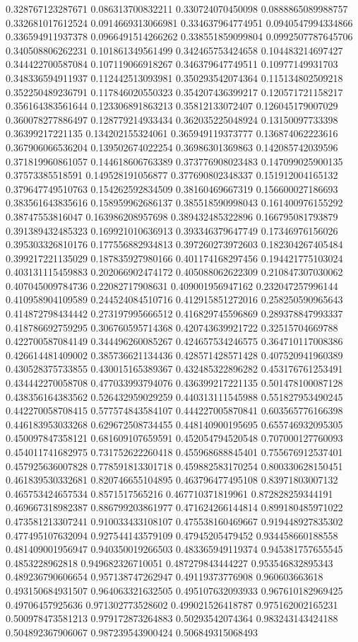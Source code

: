 \begin{table}
\begin{tabu}
\begin{sparkline}{10}
0.328767123287671 0.086313700832211 0.330724070450098 0.0888865089988757 0.332681017612524 0.0914669313066981 0.334637964774951 0.0940547994334866 0.336594911937378 0.0966491514266262 0.338551859099804 0.0992507787645706 0.340508806262231 0.101861349561499 0.342465753424658 0.104483214697427 0.344422700587084 0.107119066918267 0.346379647749511 0.10977149931703 0.348336594911937 0.112442513093981 0.350293542074364 0.115134802509218 0.352250489236791 0.117846020550323 0.354207436399217 0.120571721158217 0.356164383561644 0.123306891863213 0.35812133072407 0.126045179007029 0.360078277886497 0.128779214933434 0.362035225048924 0.13150097733398 0.36399217221135 0.134202155324061 0.365949119373777 0.136874062223616 0.367906066536204 0.139502674022254 0.36986301369863 0.142085742039596 0.371819960861057 0.144618606763389 0.373776908023483 0.147099025900135 0.37573385518591 0.149528191056877 0.377690802348337 0.151912004165132 0.379647749510763 0.154262592834509 0.38160469667319 0.156600027186693 0.383561643835616 0.158959962686137 0.385518590998043 0.161400976155292 0.38747553816047 0.163986208957698 0.389432485322896 0.166795081793879 0.391389432485323 0.169921010636913 0.393346379647749 0.17346976156026 0.395303326810176 0.177556882934813 0.397260273972603 0.182304267405484 0.399217221135029 0.187835927980166 0.401174168297456 0.194421775103024 0.403131115459883 0.202066902474172 0.405088062622309 0.210847307030062 0.407045009784736 0.22082717908631 0.409001956947162 0.232047257996144 0.410958904109589 0.244524084510716 0.412915851272016 0.258250590965643 0.414872798434442 0.273197995666512 0.416829745596869 0.289378847993337 0.418786692759295 0.306760595714368 0.420743639921722 0.32515704669788 0.422700587084149 0.344496260085267 0.424657534246575 0.364710117008386 0.426614481409002 0.385736621134436 0.428571428571428 0.407520941960389 0.430528375733855 0.430015165389367 0.432485322896282 0.453176761253491 0.434442270058708 0.477033993794076 0.436399217221135 0.501478100087128 0.438356164383562 0.526432959029259 0.440313111545988 0.551827953490245 0.442270058708415 0.577574843584107 0.444227005870841 0.603565776166398 0.446183953033268 0.629672508734455 0.448140900195695 0.655746932095305 0.450097847358121 0.681609107659591 0.452054794520548 0.707000127760093 0.454011741682975 0.731752622260418 0.455968688845401 0.755676912537401 0.457925636007828 0.778591813301718 0.459882583170254 0.800330628150451 0.461839530332681 0.820746655104895 0.463796477495108 0.83971803007132 0.465753424657534 0.8571517565216 0.467710371819961 0.872828259344191 0.469667318982387 0.886799203861977 0.471624266144814 0.899180485971022 0.473581213307241 0.910033433108107 0.475538160469667 0.919448927835302 0.477495107632094 0.927544143579109 0.47945205479452 0.934458660188558 0.481409001956947 0.940350019266503 0.483365949119374 0.945381757655545 0.4853228962818 0.949682326710051 0.487279843444227 0.953546832895343 0.489236790606654 0.957138747262947 0.49119373776908 0.960603663618 0.493150684931507 0.964063321632505 0.495107632093933 0.967610182969425 0.49706457925636 0.971302773528602 0.499021526418787 0.975162002165231 0.500978473581213 0.979172873264883 0.50293542074364 0.983243143424188 0.504892367906067 0.987239543900424 0.506849315068493 
\end{sparkline}
\end{tabu}
\end{table}
